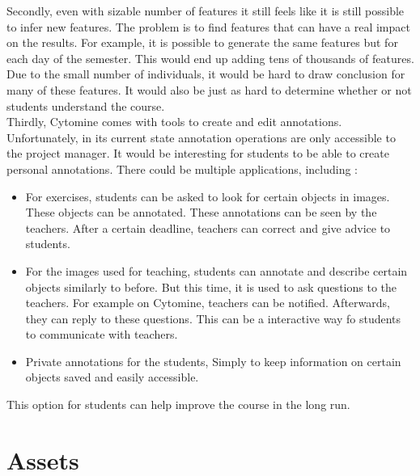 \documentclass[a4paper,11pt]{report}
\numberwithin{figure}{section} %
\begin{document}
        Secondly, even with sizable number of features it still feels like it is still possible to infer new features.
        The problem is to find features that can have a real impact on the results.
        For example, it is possible to generate the same features but for each day of the semester.
        This would end up adding tens of thousands of features.
        Due to the small number of individuals, it would be hard to draw conclusion for many of these features.
        It would also be just as hard to determine whether or not students understand the course.\\

        Thirdly, Cytomine comes with tools to create and edit annotations.
        Unfortunately, in its current state annotation operations are only accessible to the project manager.
        It would be interesting for students to be able to create personal annotations.
        There could be multiple applications, including :
        \begin{itemize}
            \item[\textbullet] For exercises, students can be asked to look for certain objects in images.
            These objects can be annotated.
            These annotations can be seen by the teachers.
            After a certain deadline, teachers can correct and give advice to students.
            \item[\textbullet] For the images used for teaching, students can annotate and describe certain objects similarly to before.
            But this time, it is used to ask questions to the teachers.
            For example on Cytomine, teachers can be notified.
            Afterwards, they can reply to these questions.
            This can be a interactive way fo students to communicate with teachers.
            \item[\textbullet] Private annotations for the students, Simply to keep information on certain objects saved and easily accessible.
        \end{itemize}
        This option for students can help improve the course in the long run.

    \section{Assets}
\end{document}
